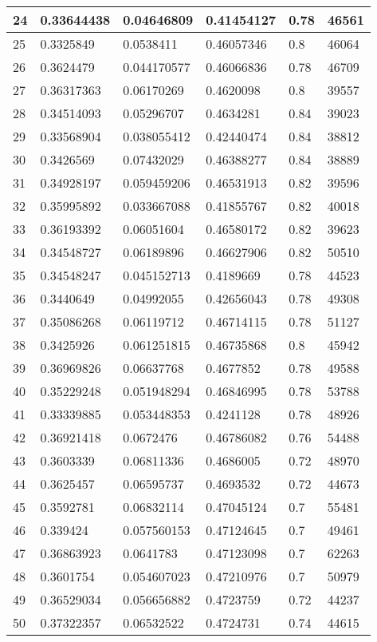 \begin{longtable}{|l|l|l|l|l|l|}
24 & 0.33644438 & 0.04646809 & 0.41454127 & 0.78 & 46561 \\ \hline 
25 & 0.3325849 & 0.0538411 & 0.46057346 & 0.8 & 46064 \\ \hline 
26 & 0.3624479 & 0.044170577 & 0.46066836 & 0.78 & 46709 \\ \hline 
27 & 0.36317363 & 0.06170269 & 0.4620098 & 0.8 & 39557 \\ \hline 
28 & 0.34514093 & 0.05296707 & 0.4634281 & 0.84 & 39023 \\ \hline 
29 & 0.33568904 & 0.038055412 & 0.42440474 & 0.84 & 38812 \\ \hline 
30 & 0.3426569 & 0.07432029 & 0.46388277 & 0.84 & 38889 \\ \hline 
31 & 0.34928197 & 0.059459206 & 0.46531913 & 0.82 & 39596 \\ \hline 
32 & 0.35995892 & 0.033667088 & 0.41855767 & 0.82 & 40018 \\ \hline 
33 & 0.36193392 & 0.06051604 & 0.46580172 & 0.82 & 39623 \\ \hline 
34 & 0.34548727 & 0.06189896 & 0.46627906 & 0.82 & 50510 \\ \hline 
35 & 0.34548247 & 0.045152713 & 0.4189669 & 0.78 & 44523 \\ \hline 
36 & 0.3440649 & 0.04992055 & 0.42656043 & 0.78 & 49308 \\ \hline 
37 & 0.35086268 & 0.06119712 & 0.46714115 & 0.78 & 51127 \\ \hline 
38 & 0.3425926 & 0.061251815 & 0.46735868 & 0.8 & 45942 \\ \hline 
39 & 0.36969826 & 0.06637768 & 0.4677852 & 0.78 & 49588 \\ \hline 
40 & 0.35229248 & 0.051948294 & 0.46846995 & 0.78 & 53788 \\ \hline 
41 & 0.33339885 & 0.053448353 & 0.4241128 & 0.78 & 48926 \\ \hline 
42 & 0.36921418 & 0.0672476 & 0.46786082 & 0.76 & 54488 \\ \hline 
43 & 0.3603339 & 0.06811336 & 0.4686005 & 0.72 & 48970 \\ \hline 
44 & 0.3625457 & 0.06595737 & 0.4693532 & 0.72 & 44673 \\ \hline 
45 & 0.3592781 & 0.06832114 & 0.47045124 & 0.7 & 55481 \\ \hline 
46 & 0.339424 & 0.057560153 & 0.47124645 & 0.7 & 49461 \\ \hline 
47 & 0.36863923 & 0.0641783 & 0.47123098 & 0.7 & 62263 \\ \hline 
48 & 0.3601754 & 0.054607023 & 0.47210976 & 0.7 & 50979 \\ \hline 
49 & 0.36529034 & 0.056656882 & 0.4723759 & 0.72 & 44237 \\ \hline 
50 & 0.37322357 & 0.06532522 & 0.4724731 & 0.74 & 44615 \\ \hline 
\end{longtable}